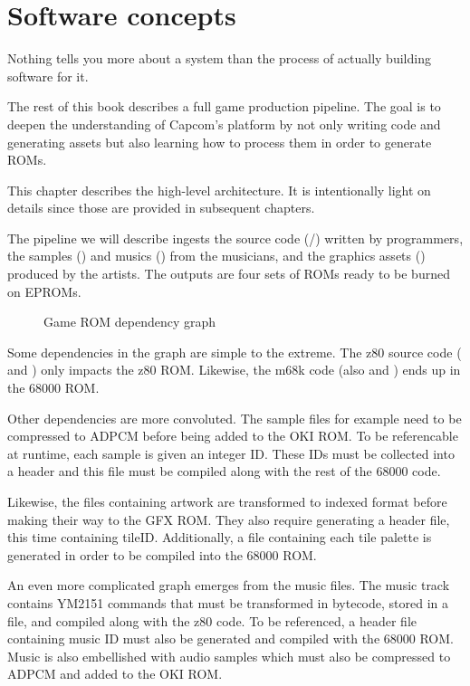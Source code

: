 \chapter{Software concepts}

Nothing tells you more about a system than the process of actually building software for it.

The rest of this book describes a full game production pipeline. The goal is to deepen the understanding of Capcom's platform by not only writing code and generating assets but also learning how to process them in order to generate ROMs.

This chapter describes the high-level architecture. It is intentionally light on details since those are provided in subsequent chapters.

The pipeline we will describe ingests the source code (/) written by programmers, the samples () and musics () from the musicians, and the graphics assets () produced by the artists. The outputs are four sets of ROMs ready to be burned on EPROMs. 

 \begin{figure}[H]
\caption*{Game ROM dependency graph}
\end{figure}

\pagebreak
Some dependencies in the graph are simple to the extreme. The z80 source code ( and ) only impacts the z80 ROM. Likewise, the m68k code (also  and ) ends up in the 68000 ROM.

Other dependencies are more convoluted. The  sample files for example need to be compressed to ADPCM before being added to the OKI ROM. To be referencable at runtime, each sample is given an integer ID. These IDs must be collected into a  header and this file must be compiled along with the rest of the 68000 code.

Likewise, the  files containing artwork are transformed to indexed format before making their way to the GFX ROM. They also require generating a  header file, this time containing tileID. Additionally, a  file containing each tile palette is generated in order to be compiled into the 68000 ROM. 

An even more complicated graph emerges from the music  files. The music track contains YM2151 commands that must be transformed in bytecode, stored in a  file, and compiled along with the z80 code. To be referenced, a header file containing music ID must also be generated and compiled with the 68000 ROM. Music is also embellished with audio samples which must also be compressed to ADPCM and added to the OKI ROM.

